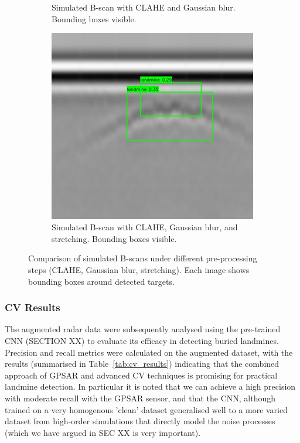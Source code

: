 \begin{figure}[htbp]
\begin{subfigure}[b]{0.32\textwidth}
                \caption{Simulated B-scan with CLAHE and Gaussian blur. Bounding boxes visible.}
                \label{fig:bscan_blur}
            \end{subfigure}
            \hfill
            \begin{subfigure}[b]{0.32\textwidth}
                \centering
                \includegraphics[width=\textwidth]{figs/Rory/sim_bscan_clahe_detection_blur_stretched_cropped.png}
                \caption{Simulated B-scan with CLAHE, Gaussian blur, and stretching. Bounding boxes visible.}
                \label{fig:bscan_blur_stretched}
            \end{subfigure}
            
            \caption{Comparison of simulated B-scans under different pre-processing steps (CLAHE, Gaussian blur, stretching). Each image shows bounding boxes around detected targets.}
            \label{fig:sim_bscan_comparison}
        \end{figure}
        
    
    \subsubsection{CV Results}
    
        The augmented radar data were subsequently analysed using the pre-trained CNN (SECTION XX) to evaluate its efficacy in detecting buried landmines. Precision and recall metrics were calculated on the augmented dataset, with the results (summarised in Table~\ref{tab:cv_results}) indicating that the combined approach of GPSAR and advanced CV techniques is promising for practical landmine detection. In particular it is noted that we can achieve a high precision with moderate recall with the GPSAR sensor, and that the CNN, although trained on a very homogenous 'clean' dataset generalised well to a more varied dataset from high-order simulations that directly model the noise processes (which we have argued in SEC XX is very important).
        
